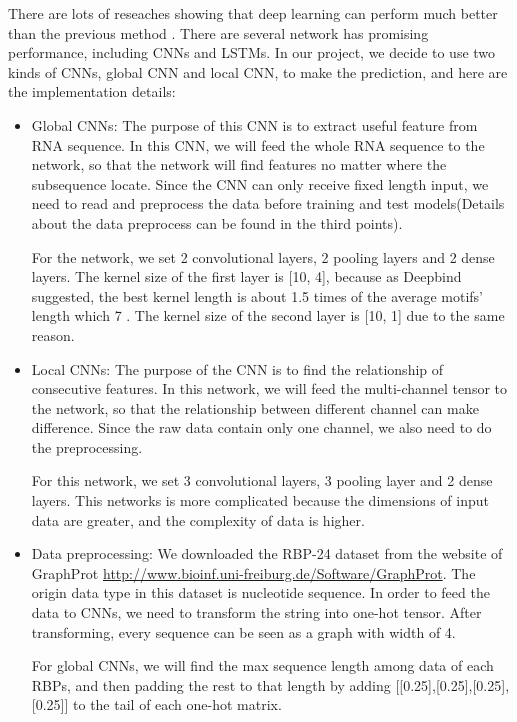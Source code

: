 \documentclass[twoside,twocolumn]{article}
\begin{document}
There are lots of reseaches showing that deep learning can perform much better than the previous method \cite{ref2}. There are several network has promising performance, including CNNs and LSTMs. In our project, we decide to use two kinds of CNNs, global CNN and local CNN, to make the prediction, and here are the implementation details:
\begin{itemize}
    \item Global CNNs: The purpose of this CNN is to extract useful feature from RNA sequence. In this CNN, we will feed the whole RNA sequence to the network, so that the network will find features no matter where the subsequence locate. Since the CNN can only receive fixed length input, we need to read and preprocess the data before training and test models(Details about the data preprocess can be found in the third points). 
    
    For the network, we set 2 convolutional layers, 2 pooling layers and 2 dense layers. The kernel size of the first layer is [10, 4], because as Deepbind suggested, the best kernel length is about 1.5 times of the average motifs' length which 7 \cite{ref3}. The kernel size of the second layer is [10, 1] due to the same reason.

    \item Local CNNs: The purpose of the CNN is to find the relationship of consecutive features. In this network, we will feed the multi-channel tensor to the network, so that the relationship between different channel can make difference. Since the raw data contain only one channel, we also need to do the preprocessing.
    
    For this network, we set 3 convolutional layers, 3 pooling layer and 2 dense layers. This networks is more complicated because the dimensions of input data are greater, and the complexity of data is higher. 

    \item Data preprocessing: We downloaded the RBP-24 dataset from the website of GraphProt \href{http://www.bioinf.uni-freiburg.de/Software/GraphProt}{http://www.bioinf.uni-freiburg.de/Software/GraphProt}. The origin data type in this dataset is nucleotide sequence. In order to feed the data to CNNs, we need to transform the string into one-hot tensor. After transforming, every sequence can be seen as a graph with width of 4. 
    
    For global CNNs, we will find the max sequence length among data of each RBPs, and then padding the rest to that length by adding [[0.25],[0.25],[0.25],[0.25]] to the tail of each one-hot matrix.


\end{itemize}
\end{document}
